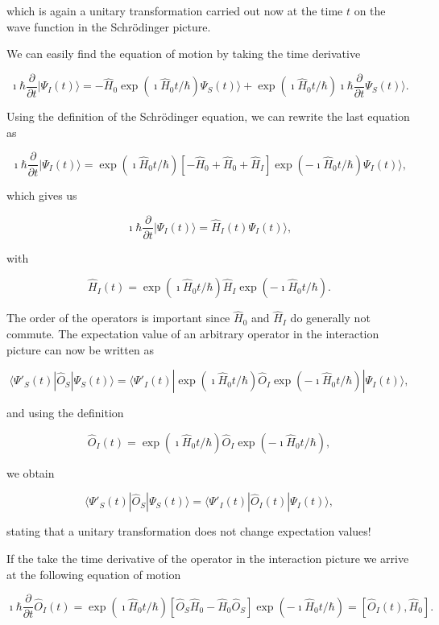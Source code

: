 which is again a unitary transformation carried out now at the time $t$ on the 
wave function in the Schrödinger picture. 



We can easily find the equation of motion by taking the time derivative

\[
\imath \hbar\frac{\partial }{\partial t}|\Psi_I(t)\rangle = -\hat{H}_0\exp{(\imath\hat{H}_0t/\hbar)}\Psi_S(t)\rangle+\exp{(\imath\hat{H}_0t/\hbar)}
\imath \hbar\frac{\partial }{\partial t}\Psi_S(t)\rangle.
\]


Using the definition of the Schrödinger equation, we can rewrite the last equation as 

\[
\imath \hbar\frac{\partial }{\partial t}|\Psi_I(t)\rangle = \exp{(\imath\hat{H}_0t/\hbar)}\left[-\hat{H}_0+\hat{H}_0+\hat{H}_I\right]\exp{(-\imath\hat{H}_0t/\hbar)}\Psi_I(t)\rangle,
\]

which gives us

\[
\imath \hbar\frac{\partial }{\partial t}|\Psi_I(t)\rangle = \hat{H}_I(t)\Psi_I(t)\rangle,
\]

 with 

\[
\hat{H}_I(t)=
\exp{(\imath\hat{H}_0t/\hbar)}\hat{H}_I\exp{(-\imath\hat{H}_0t/\hbar)}.
\]


The order of the operators is important since $\hat{H}_0$ and $\hat{H}_I$ do generally not commute.
The expectation value of
an arbitrary operator in the interaction picture can now be written as

\[
\langle \Psi'_S(t)|\hat{O}_S|\Psi_S(t)\rangle = 
\langle \Psi'_I(t) |\exp{(\imath\hat{H}_0t/\hbar)}\hat{O}_I
\exp{(-\imath\hat{H}_0t/\hbar)}|\Psi_I(t)\rangle,
\]

and using the definition

\[
\hat{O}_I(t)=
\exp{(\imath\hat{H}_0t/\hbar)}\hat{O}_I\exp{(-\imath\hat{H}_0t/\hbar)},
\]

we obtain

\[
\langle \Psi'_S(t)|\hat{O}_S|\Psi_S(t)\rangle = 
\langle \Psi'_I(t) |\hat{O}_I(t)|\Psi_I(t)\rangle,
\]

stating that a unitary transformation does not change expectation values!



If the take the time derivative of the operator in the interaction picture we arrive at the following equation of motion

\[
\imath \hbar\frac{\partial }{\partial t}\hat{O}_I(t) = \exp{(\imath\hat{H}_0t/\hbar)}\left[\hat{O}_S\hat{H}_0-\hat{H}_0\hat{O}_S\right]\exp{(-\imath\hat{H}_0t/\hbar)}=\left[\hat{O}_I(t),\hat{H}_0\right].
\]

